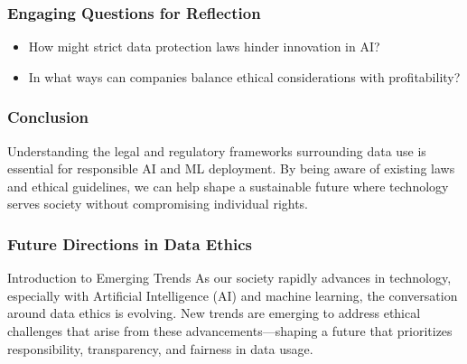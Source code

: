 \documentclass[aspectratio=169]{beamer}
\begin{document}
\begin{frame}[fragile]
    \frametitle{Engaging Questions for Reflection}
    \begin{itemize}
        \item How might strict data protection laws hinder innovation in AI?
        \item In what ways can companies balance ethical considerations with profitability?
    \end{itemize}
\end{frame}

\begin{frame}[fragile]
    \frametitle{Conclusion}
    Understanding the legal and regulatory frameworks surrounding data use is essential for responsible AI and ML deployment. By being aware of existing laws and ethical guidelines, we can help shape a sustainable future where technology serves society without compromising individual rights.
\end{frame}

\begin{frame}[fragile]
    \frametitle{Future Directions in Data Ethics}
    \begin{block}{Introduction to Emerging Trends}
        As our society rapidly advances in technology, especially with Artificial Intelligence (AI) and machine learning, the conversation around data ethics is evolving. New trends are emerging to address ethical challenges that arise from these advancements—shaping a future that prioritizes responsibility, transparency, and fairness in data usage.
    \end{block}
\end{frame}
\end{document}
